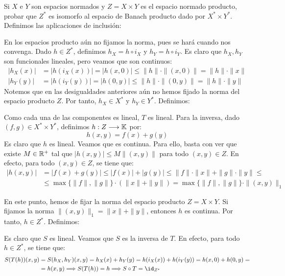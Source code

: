 \begin{ejercicio}
Si $X$ e $Y$ son espacios normados y $Z = X \times Y$ es el espacio normado producto, probar que $Z^*$ es isomorfo al espacio de Banach producto dado por $X^* \times Y^*$.\\

Definimos las aplicaciones de inclusión:

En los espacios producto aún no fijamos la norma, pues se hará cuando nos convenga. Dado $h\in Z^*$, definimos $h_X = h \circ i_X$ y $h_Y = h \circ i_Y$. Es claro que $h_X,h_Y$ son funcionales lineales, pero veamos que son continuos:
\begin{align*}
    |h_X(x)| &= |h(i_X(x))| = |h(x, 0)| \leq \|h\| \cdot \|(x, 0)\| = \|h\| \cdot \|x\|\\
    |h_Y(y)| &= |h(i_Y(y))| = |h(0, y)| \leq \|h\| \cdot \|(0, y)\| = \|h\| \cdot \|y\|
\end{align*}
Notemos que en las desigualdades anteriores aún no hemos fijado la norma del espacio producto $Z$. Por tanto, $h_X \in X^*$ y $h_Y \in Y^*$. Definimos:

Como cada una de las componentes es lineal, $T$ es lineal. Para la inversa, dado $(f, g) \in X^* \times Y^*$, definimos $h: Z \longrightarrow \mathbb{K}$ por:
\begin{equation*}
    h(x, y) = f(x) + g(y)
\end{equation*}
Es claro que $h$ es lineal. Veamos que es continua. Para ello, basta con ver que existe $M \in \mathbb{R}^+$ tal que $|h(x, y)| \leq M \|(x, y)\|$ para todo $(x, y) \in Z$. En efecto, para todo $(x, y) \in Z$, se tiene que:
\begin{align*}
    |h(x, y)| &= |f(x) + g(y)| \leq |f(x)| + |g(y)| \leq \|f\| \cdot \|x\| + \|g\| \cdot \|y\| \leq \\ &\leq \max\{\|f\|, \|g\|\} \cdot (\|x\| + \|y\|) = \max\{\|f\|, \|g\|\} \cdot \|(x, y)\|_1
\end{align*}

En este punto, hemos de fijar la norma del espacio producto $Z=X \times Y$. Si fijamos la norma $\|(x, y)\|_1 = \|x\| + \|y\|$, entonces $h$ es continua. Por tanto, $h \in Z^*$. Definimos:

Es claro que $S$ es lineal. Veamos que $S$ es la inversa de $T$. En efecto, para todo $h \in Z^*$, se tiene que:
\begin{align*}
    S(T(h))(x, y) &= S(h_X, h_Y)(x, y) = h_X(x) + h_Y(y) = h(i_X(x)) + h(i_Y(y)) = h(x, 0) + h(0, y) =\\&= h(x, y) \Longrightarrow S(T(h)) = h \Longrightarrow S \circ T = \id_{Z^*}
\end{align*}


\end{ejercicio}

